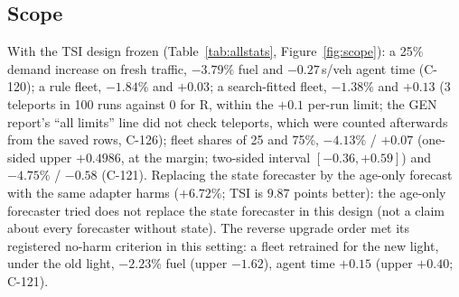 \documentclass[11pt]{article}
\begin{document}
\subsection{Scope}
With the TSI design frozen (Table~\ref{tab:allstats}, Figure~\ref{fig:scope}): a 25\% demand increase on fresh traffic, $-3.79\%$ fuel and $-0.27$\,s/veh agent
time (C-120); a rule fleet, $-1.84\%$ and $+0.03$; a search-fitted fleet, $-1.38\%$ and $+0.13$ (3 teleports in 100 runs against 0 for R, within the $+0.1$ per-run limit; the GEN report's ``all limits'' line did not check teleports, which were counted afterwards from the saved rows, C-126); fleet shares of 25 and 75\%, $-4.13\%$
/ $+0.07$ (one-sided upper $+0.4986$, at the margin; two-sided interval $[-0.36, +0.59]$) and $-4.75\%$ / $-0.58$ (C-121). Replacing the state forecaster by the age-only forecast with the same
adapter harms ($+6.72\%$; TSI is $9.87$ points better): the age-only forecaster tried does not replace the state forecaster in this
design (not a claim about every forecaster without state). The reverse upgrade order met its registered no-harm criterion
in this setting: a fleet retrained for the new light, under the old light, $-2.23\%$ fuel (upper $-1.62$), agent time $+0.15$ (upper $+0.40$; C-121).
\end{document}
